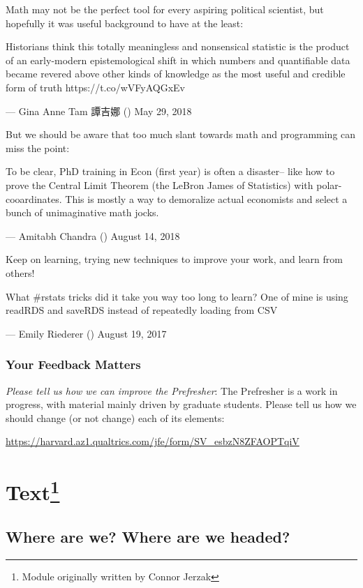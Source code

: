 \documentclass[]{book}
\let\rmarkdownfootnote\footnote%
\def\footnote{\protect\rmarkdownfootnote}
\theoremstyle{definition}
\theoremstyle{definition}
\theoremstyle{definition}
\theoremstyle{remark}
\begin{document}
Math may not be the perfect tool for every aspiring political scientist,
but hopefully it was useful background to have at the least:

Historians think this totally meaningless and nonsensical statistic is
the product of an early-modern epistemological shift in which numbers
and quantifiable data became revered above other kinds of knowledge as
the most useful and credible form of truth https://t.co/wVFyAQGxEv

--- Gina Anne Tam 譚吉娜 (\citet{DGTam86}) May 29, 2018

But we should be aware that too much slant towards math and programming
can miss the point:

To be clear, PhD training in Econ (first year) is often a disaster--
like how to prove the Central Limit Theorem (the LeBron James of
Statistics) with polar-cooardinates. This is mostly a way to demoralize
actual economists and select a bunch of unimaginative math jocks.

--- Amitabh Chandra (\citet{amitabhchandra2}) August 14, 2018

Keep on learning, trying new techniques to improve your work, and learn
from others!

What \#rstats tricks did it take you way too long to learn? One of mine
is using readRDS and saveRDS instead of repeatedly loading from CSV

--- Emily Riederer (\citet{EmilyRiederer}) August 19, 2017

\subsection*{Your Feedback Matters}\label{your-feedback-matters}

\emph{Please tell us how we can improve the Prefresher}: The Prefresher
is a work in progress, with material mainly driven by graduate students.
Please tell us how we should change (or not change) each of its
elements:

\url{https://harvard.az1.qualtrics.com/jfe/form/SV_esbzN8ZFAOPTqiV}

\chapter[Text]{\texorpdfstring{Text\footnote{Module originally written
  by Connor Jerzak}}{Text}}\label{rtext}

\section*{Where are we? Where are we
headed?}\label{where-are-we-where-are-we-headed-7}
\end{document}
